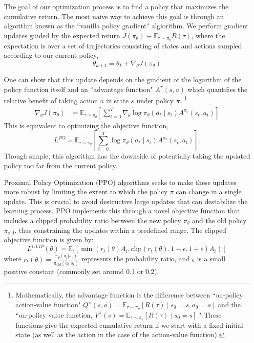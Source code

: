 The goal of our optimization process is to find a policy that maximizes the cumulative return. The most naive way to achieve this goal is through an algorithm known as the ``vanilla policy gradient" algiorithm. We perform gradient updates guided by the expected return $J(\pi_\theta) \equiv \mathbb{E}_{\tau \sim \pi_\theta} R(\tau)$, where the expectation is over a set of trajectories consisting of states and actions sampled according to our current policy, 
\[
\theta_{k+1} = \theta_k + \nabla_\theta J(\pi_\theta)
\]

One can show that this update depends on the gradient of the logarithm of the policy function itself and an ``advantage function" \( A^\pi (s, a) \) which quantifies the relative benefit of taking action \( a \) in state \( s \) under policy \( \pi \).
\footnote{
Mathematically, the advantage function is the difference between ``on-policy action-value function" $Q^{\pi}(s, a) = \mathbb{E}_{\tau \sim \pi_\theta} [R(\tau) \mid s_0 = s, a_0 = a]$ and the ``on-policy value function, $V^{\pi}(s) = \mathbb{E}_{\tau \sim \pi_\theta} [R(\tau) \mid s_0 = s]$." These functions give the expected cumulative return if we start with a fixed initial state (as well as the action in the case of the action-value function).
}
\begin{align*}
	\nabla_\theta J(\pi_\theta) &= \mathbb{E}_{\tau \sim \pi_\theta} \left[ \sum\limits_{t=0}^T \nabla_\theta \log 								\pi_\theta (a_t \mid s_t) A^{\pi_\theta} (s_t, a_t) \right]
\end{align*}
This is equivalent to optimizing the objective function, 
\[
L^{PG} = \mathbb{E}_{\tau \sim \pi_\theta} \left[ \sum\limits_{t=0}^T \log 								\pi_\theta (a_t \mid s_t) A^{\pi_\theta} (s_t, a_t) \right].
\]
Though simple, this algorithm has the downside of potentially taking the updated policy too far from the current policy.

Proximal Policy Optimization (PPO) algorithms seeks to make these updates more robust by limiting the extent to which the policy \( \pi \) can change in a single update. This is crucial to avoid destructive large updates that can destabilize the learning process. PPO implements this through a novel objective function that includes a clipped probability ratio between the new policy \( \pi_\theta \) and the old policy \( \pi_{\text{old}} \), thus constraining the updates within a predefined range. The clipped objective function is given by:
\[
L^{CLIP}(\theta) = \mathbb{E}_t\left[ \min(r_t(\theta) A_t, \text{clip}(r_t(\theta), 1 - \epsilon, 1 + \epsilon) A_t) \right]
\]
where \( r_t(\theta) = \frac{\pi_\theta(a_t | s_t)}{\pi_{\text{old}}(a_t | s_t)} \) represents the probability ratio, and \( \epsilon \) is a small positive constant (commonly set around 0.1 or 0.2).

